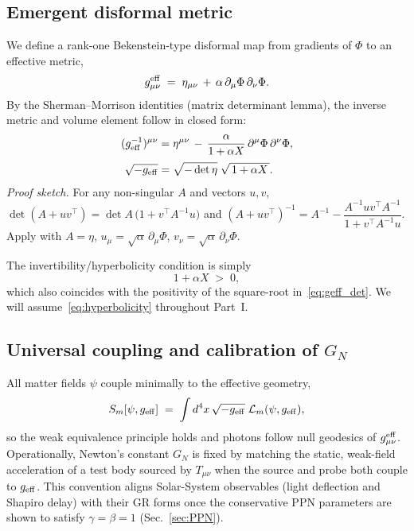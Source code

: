 \documentclass{article}
\begin{document}
\subsection{Emergent disformal metric}
\label{sec:disformal}

We define a rank-one Bekenstein-type disformal map from gradients of $\Phi$ to an effective metric,
\begin{equation}
g^{\rm eff}_{\mu\nu} \;=\; \eta_{\mu\nu} \,+\, \alpha\,\partial_\mu\Phi\,\partial_\nu\Phi.
\label{eq:geff_def}
\end{equation}
By the Sherman–Morrison identities (matrix determinant lemma), the inverse metric and volume element follow in closed form:
\begin{align}
(g_{\rm eff}^{-1})^{\mu\nu} &= \eta^{\mu\nu}
\,-\, \frac{\alpha}{1+\alpha X}\,\partial^\mu\Phi\,\partial^\nu\Phi,
\label{eq:geff_inv}\\[2pt]
\sqrt{-g_{\rm eff}} &= \sqrt{-\det\eta}\;\sqrt{\,1+\alpha X\,}.
\label{eq:geff_det}
\end{align}
\begingroup\small
\noindent\emph{Proof sketch.} For any non-singular $A$ and vectors $u,v$,
$\det(A+u v^\top)=\det A\,\big(1+v^\top A^{-1}u\big)$ and
$(A+u v^\top)^{-1}=A^{-1}-\dfrac{A^{-1}u v^\top A^{-1}}{1+v^\top A^{-1}u}$.
Apply with $A=\eta$, $u_\mu=\sqrt{\alpha}\,\partial_\mu\Phi$, $v_\nu=\sqrt{\alpha}\,\partial_\nu\Phi$.
\par\endgroup

The invertibility/hyperbolicity condition is simply
\begin{equation}
1+\alpha X \;>\; 0,
\label{eq:hyperbolicity}
\end{equation}
which also coincides with the positivity of the square-root in~\eqref{eq:geff_det}. We will assume~\eqref{eq:hyperbolicity} throughout Part~I.
\subsection{Universal coupling and calibration of \texorpdfstring{$G_N$}{G\_N}}
\label{sec:coupling}

All matter fields $\psi$ couple minimally to the effective geometry,
\begin{equation}
S_m[\psi,g_{\rm eff}] \;=\; \int d^4x\,\sqrt{-g_{\rm eff}}\;\mathcal L_m(\psi,g_{\rm eff}) ,
\label{eq:Smatter}
\end{equation}
so the weak equivalence principle holds and photons follow null geodesics of $g^{\rm eff}_{\mu\nu}$. Operationally, Newton’s constant $G_N$ is fixed by matching the static, weak-field acceleration of a test body sourced by $T_{\mu\nu}$ when the source and probe both couple to $g_{\rm eff}$. This convention aligns Solar-System observables (light deflection and Shapiro delay) with their GR forms once the conservative PPN parameters are shown to satisfy $\gamma=\beta=1$ (Sec.~\ref{sec:PPN}).
\end{document}
